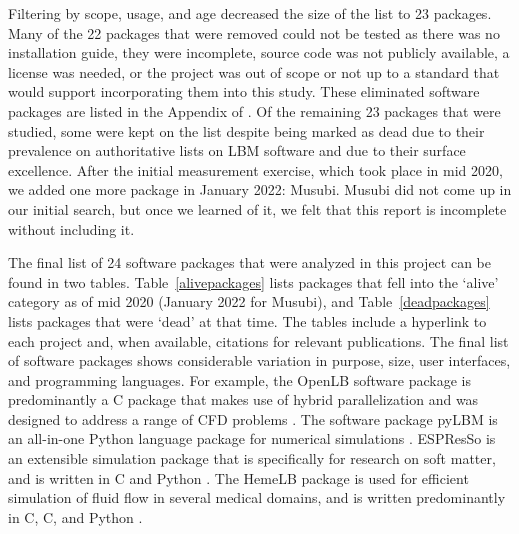 \documentclass[final, 3p, times, authoryear]{elsarticle}
\newcommand{\CC}{C\nolinebreak\hspace{-.05em}\raisebox{.4ex}{\small\bf
+}\nolinebreak\hspace{-.10em}\raisebox{.4ex}{\small\bf +}}
\begin{document}
Filtering by scope, usage, and age decreased the size of the list to 23
packages. Many of the 22 packages that were removed could not be tested as there
was no installation guide, they were incomplete, source code was not publicly
available, a license was needed, or the project was out of scope or not up to a
standard that would support incorporating them into this study. These eliminated
software packages are listed in the Appendix of \citet{Michalski2021}. Of the
remaining 23 packages that were studied, some were kept on the list despite
being marked as dead due to their prevalence on authoritative lists on LBM
software and due to their surface excellence.  After the initial measurement
exercise, which took place in mid 2020, we added one more package in January
2022: Musubi.  Musubi did not come up in our initial search, but once we learned
of it, we felt that this report is incomplete without including it.

The final list of 24 software packages that were analyzed in this project can be
found in two tables. Table~\ref{alivepackages} lists packages that fell into the
`alive' category as of mid 2020 (January 2022 for Musubi), and
Table~\ref{deadpackages} lists packages that were `dead' at that time. The
tables include a hyperlink to each project and, when available, citations for
relevant publications.  The final list of software packages shows considerable
variation in purpose, size, user interfaces, and programming languages. For
example, the OpenLB software package is predominantly a \CC{} package that makes
use of hybrid parallelization and was designed to address a range of CFD
problems \citep{heuveline2009towards}. The software package pyLBM is an
all-in-one Python language package for numerical simulations
\citep{graille2017pylbm}. ESPResSo is an extensible simulation package that is
specifically for research on soft matter, and is written in \CC{} and Python
\citep{weik2019espresso}. The HemeLB package is used for efficient simulation of
fluid flow in several medical domains, and is written predominantly in C, \CC,
and Python \citep{mazzeo2008hemelb}.
\end{document}
